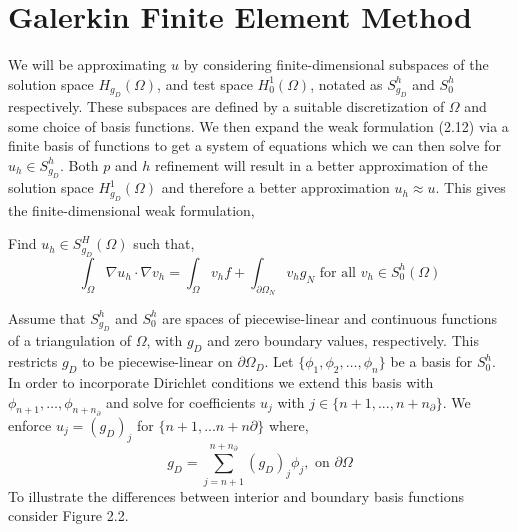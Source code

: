 \documentclass[12 pt]{report}
\begin{document}
\section{Galerkin Finite Element Method}
We will be approximating $u$ by considering finite-dimensional subspaces of the solution space $H_{g_D}(\Omega)$, and test space $H_{0}^1(\Omega)$, notated as $S^h_{g_D}$ and $S^h_{0}$ respectively. These subspaces are defined by a suitable discretization of $\Omega$ and some choice of basis functions. We then expand the weak formulation (2.12) via a finite basis of functions to get a system of equations which we can then solve for $u_h \in S^h_{g_D}$. Both $p$ and $h$ refinement will result in a better approximation of the solution space $H_{g_D}^1(\Omega)$ and therefore a better approximation $u_h \approx u$. This gives the finite-dimensional weak formulation, 
\begin{mdframed}
  Find $u_h \in  {S}^H_{g_D}(\Omega) $ such that, 
  \begin{equation}  \label{eq:poisson finite dim}
    \int_{\Omega} \nabla u_h \cdot \nabla v_h = \int_{\Omega} v_hf + \int_{\partial\Omega_N} v_hg_N \text{ for all } v_h \in {S}_{0}^h(\Omega)
  \end{equation}
\end{mdframed}


Assume that $S^h_{g_D}$ and $S^h_{0}$ are spaces of piecewise-linear and continuous functions of a triangulation of $\Omega$, with $g_D$ and zero boundary values, respectively. This restricts $g_D$ to be piecewise-linear on $\partial \Omega_D$. Let $\{\phi_1, \phi_2, \dots ,\phi_n\}$ be a basis for $S^h_{0}$. In order to incorporate Dirichlet conditions we extend this basis with $\phi_{n + 1}, \dots,\phi_{n + n_\partial}$ and solve for coefficients $u_j$ with $j \in \{n + 1, ..., n + n_\partial\}$. We enforce $u_j = (g_D)_j$ for $\{n + 1, ... n + n\partial \}$ where,  
\begin{equation}
  g_D = \sum_{j = n + 1}^{n + n_\partial} (g_D)_j \phi_j, \text{ on } \partial \Omega
\end{equation}
To illustrate the differences between interior and boundary basis functions consider Figure 2.2.


\end{document}
